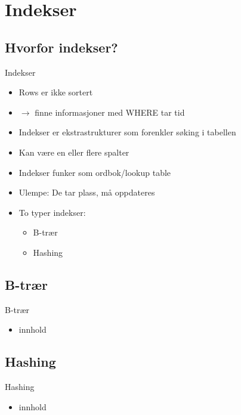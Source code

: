 
\section{Indekser}
\subsection*{Hvorfor indekser?}
\begin{frame}{Indekser}
    \begin{itemize}
        \item Rows er ikke sortert
        \item $\rightarrow$ finne informasjoner med WHERE tar tid
        \item Indekser er ekstrastrukturer som forenkler søking i tabellen
        \item Kan være en eller flere spalter
        \item Indekser funker som ordbok/lookup table
        \item Ulempe: De tar plass, må oppdateres
        \item To typer indekser:
            \begin{itemize}
                \item B-trær
                \item Hashing
            \end{itemize}
    \end{itemize}
\end{frame}

\subsection*{B-trær}
\begin{frame}{B-trær}
    \begin{itemize}
        \item innhold
    \end{itemize}
\end{frame}

\subsection*{Hashing}
\begin{frame}{Hashing}
    \begin{itemize}
        \item innhold
    \end{itemize}
\end{frame}


